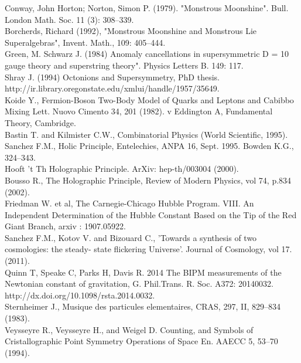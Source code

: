 \documentclass[preprint,12pt]{elsarticle}
\begin{document}
\begin{thebibliography}{99}
 Conway, John Horton; Norton, Simon P. (1979). "Monstrous Moonshine". Bull. London Math. Soc. 11 (3): 308--339.\\
 Borcherds, Richard (1992), "Monstrous Moonshine and Monstrous Lie Superalgebras", Invent. Math., 109: 405--444.\\ 
 Green, M. Schwarz J. (1984)  Anomaly cancellations in supersymmetric D = 10 gauge theory and superstring theory". Physics Letters B. 149: 117.\\
 Shray J. (1994) Octonions and Supersymmetry, PhD thesis.  http://ir.library.oregonstate.edu/xmlui/handle/1957/35649. \\
 Koide Y., Fermion-Boson Two-Body Model of Quarks and Leptons and Cabibbo Mixing  Lett. Nuovo Cimento 34, 201 (1982). v 
 Eddington A, Fundamental Theory, Cambridge.\\
 Bastin T. and Kilmister C.W., Combinatorial Physics (World Scientific, 1995).\\
  Sanchez F.M., Holic Principle, Entelechies, ANPA 16, Sept. 1995. Bowden K.G., 324--343.\\
 Hooft 't Th Holographic Principle. ArXiv: hep-th/003004 (2000). \\
 Bousso R., The Holographic Principle, Review of Modern Physics, vol 74, p.834 (2002).\\
 Friedman W. et al, The Carnegie-Chicago Hubble Program. VIII. An Independent Determination of the Hubble Constant Based on the Tip of the Red Giant Branch, arxiv : 1907.05922.\\ 
 Sanchez F.M., Kotov V. and Bizouard C., 'Towards a synthesis of two cosmologies: the steady- state flickering Universe'. Journal of Cosmology, vol 17. (2011).\\
 Quinn T, Speake C, Parks H, Davis R. 2014 The BIPM measurements of the Newtonian constant of gravitation, G. Phil.Trans. R. Soc. A372: 20140032. http://dx.doi.org/10.1098/rsta.2014.0032. \\
 Sternheimer J., Musique des particules elementaires, CRAS, 297, II, 829--834 (1983).\\
 Veysseyre R., Veysseyre H., and Weigel D. Counting, and Symbols of Cristallographic Point Symmetry Operations of Space En. AAECC 5, 53--70 (1994).\\

\end{thebibliography}
\end{document}
